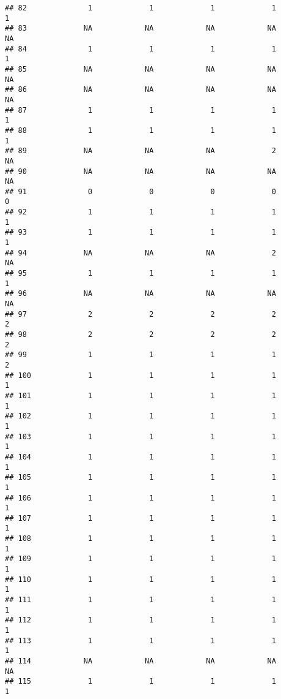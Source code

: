 \documentclass[
]{article}
\begin{document}
\begin{verbatim}
## 82              1             1             1             1             1
## 83             NA            NA            NA            NA            NA
## 84              1             1             1             1             1
## 85             NA            NA            NA            NA            NA
## 86             NA            NA            NA            NA            NA
## 87              1             1             1             1             1
## 88              1             1             1             1             1
## 89             NA            NA            NA             2            NA
## 90             NA            NA            NA            NA            NA
## 91              0             0             0             0             0
## 92              1             1             1             1             1
## 93              1             1             1             1             1
## 94             NA            NA            NA             2            NA
## 95              1             1             1             1             1
## 96             NA            NA            NA            NA            NA
## 97              2             2             2             2             2
## 98              2             2             2             2             2
## 99              1             1             1             1             2
## 100             1             1             1             1             1
## 101             1             1             1             1             1
## 102             1             1             1             1             1
## 103             1             1             1             1             1
## 104             1             1             1             1             1
## 105             1             1             1             1             1
## 106             1             1             1             1             1
## 107             1             1             1             1             1
## 108             1             1             1             1             1
## 109             1             1             1             1             1
## 110             1             1             1             1             1
## 111             1             1             1             1             1
## 112             1             1             1             1             1
## 113             1             1             1             1             1
## 114            NA            NA            NA            NA            NA
## 115             1             1             1             1             1

\end{verbatim}
\end{document}
